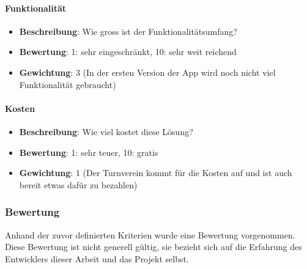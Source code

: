 \paragraph{Funktionalität}
\begin{itemize}
	\item \textbf{Beschreibung}: Wie gross ist der Funktionalitätsumfang? 
	\item \textbf{Bewertung}: 1: sehr eingeschränkt, 10: sehr weit reichend
	\item \textbf{Gewichtung}: 3 (In der ersten Version der App wird noch nicht viel Funktionalität gebraucht)
\end{itemize}

\paragraph{Kosten}
\begin{itemize}
	\item \textbf{Beschreibung}: Wie viel kostet diese Lösung? 
	\item \textbf{Bewertung}: 1: sehr teuer, 10: gratis
	\item \textbf{Gewichtung}: 1 (Der Turnverein kommt für die Kosten auf und ist auch bereit etwas dafür zu bezahlen)
\end{itemize}

\newpage
\subsubsection{Bewertung}\label{architektur_bewertung}
Anhand der zuvor definierten Kriterien wurde eine Bewertung vorgenommen. Diese Bewertung ist nicht generell gültig, sie bezieht sich auf die Erfahrung des Entwicklers dieser Arbeit und das Projekt selbst.


